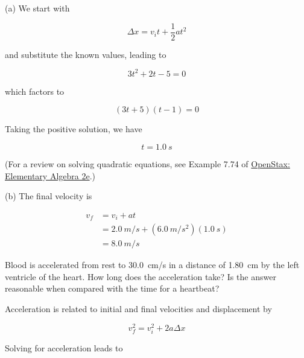 \documentclass[../main-physics-problems.tex]{subfiles}
\begin{document}
\begin{questions}
\begin{solution}
    (a) We start with

    \begin{equation*}
        \Delta x = v_i t + \frac{1}{2} a t^2
    \end{equation*}

    and substitute the known values, leading to

    \begin{equation*}
        3 t^2 + 2 t - 5 = 0
    \end{equation*}

    which factors to

    \begin{equation*}
        (3t + 5)(t - 1) = 0
    \end{equation*}

    Taking the positive solution, we have
    
    \begin{equation*}
        \boxed{t = \SI{1.0}{s}}
    \end{equation*}
    
    (For a review on solving quadratic equations, see Example 7.74 of \href{https://openstax.org/books/elementary-algebra-2e/pages/7-6-quadratic-equations}{OpenStax: Elementary Algebra 2e}.)\medskip

    (b) The final velocity is

    \begin{align*}
        v_f &= v_i + a t \\[1ex] 
        &= \SI{2.0}{m/s} + (\SI{6.0}{m/s^2})(\SI{1.0}{s}) \\[1ex]
        &= \boxed{\SI{8.0}{m/s}}
    \end{align*}
\end{solution}

\question \label{openstax-2.26}
Blood is accelerated from rest to \SI{30.0}{cm/s} in a distance of \SI{1.80}{cm} by the left ventricle of the heart. How long does the acceleration take? Is the answer reasonable when compared with the time for a heartbeat?

\begin{solution}
Acceleration is related to initial and final velocities and displacement by

\begin{equation*}
    v_f^2 = v_i^2 + 2a \Delta x 
\end{equation*}

Solving for acceleration leads to


\end{solution}
\end{questions}
\end{document}
